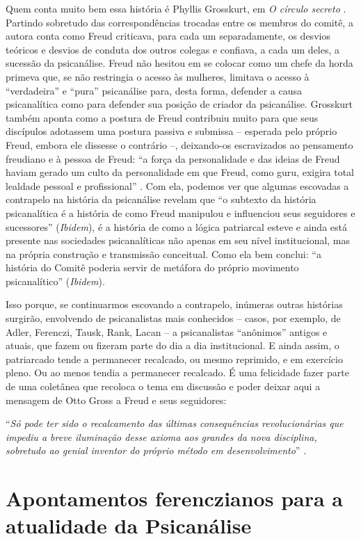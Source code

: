 Quem conta muito bem essa história é Phyllis Grosskurt, em \emph{O
círculo secreto} . Partindo sobretudo das correspondências trocadas
entre os membros do comitê, a autora conta como Freud criticava, para
cada um separadamente, os desvios teóricos e desvios de conduta dos
outros colegas e confiava, a cada um deles, a sucessão da psicanálise.
Freud não hesitou em se colocar como um chefe da horda primeva que, se
não restringia o acesso às mulheres, limitava o acesso à ``verdadeira''
e ``pura'' psicanálise para, desta forma, defender a causa psicanalítica
como para defender sua posição de criador da psicanálise. Grosskurt
também aponta como a postura de Freud contribuiu muito para que seus
discípulos adotassem uma postura passiva e submissa -- esperada pelo
próprio Freud, embora ele dissesse o contrário --, deixando-os
escravizados ao pensamento freudiano e à pessoa de Freud: ``a força da
personalidade e das ideias de Freud haviam gerado um culto da
personalidade em que Freud, como guru, exigira total lealdade pessoal e
profissional'' . Com ela, podemos ver que algumas escovadas a contrapelo
na história da psicanálise revelam que ``o subtexto da história
psicanalítica é a história de como Freud manipulou e influenciou seus
seguidores e sucessores'' (\emph{Ibidem}), é a história de como a lógica
patriarcal esteve e ainda está presente nas sociedades psicanalíticas
não apenas em seu nível institucional, mas na própria construção e
transmissão conceitual. Como ela bem conclui: ``a história do Comitê
poderia servir de metáfora do próprio movimento psicanalítico''
(\emph{Ibidem}).

Isso porque, se continuarmos escovando a contrapelo, inúmeras outras
histórias surgirão, envolvendo de psicanalistas mais conhecidos --
casos, por exemplo, de Adler, Ferenczi, Tausk, Rank, Lacan -- a
psicanalistas ``anônimos'' antigos e atuais, que fazem ou fizeram parte
do dia a dia institucional. E ainda assim, o patriarcado tende a
permanecer recalcado, ou mesmo reprimido, e em exercício pleno. Ou ao
menos tendia a permanecer recalcado. É uma felicidade fazer parte de uma
coletânea que recoloca o tema em discussão e poder deixar aqui a
mensagem de Otto Gross a Freud e seus seguidores:

``\emph{Só pode ter sido o recalcamento das últimas consequências
revolucionárias que impediu a breve iluminação desse axioma aos grandes
da nova disciplina, sobretudo ao genial inventor do próprio método em
desenvolvimento}'' .

\chapter*{Apontamentos ferenczianos para a atualidade da Psicanálise}

